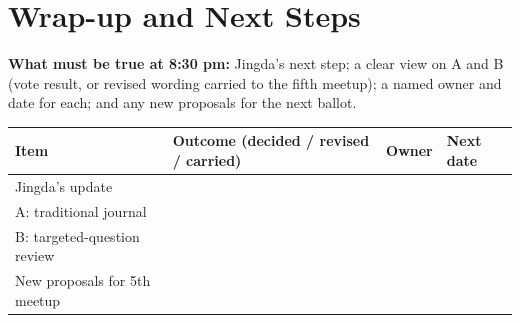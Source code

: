 \documentclass[11pt]{article}
\begin{document}
\section{Wrap-up and Next Steps}
{\small\textbf{What must be true at 8:30 pm:} Jingda's next step; a clear view on A and B (vote result, or revised wording carried to the fifth meetup); a named owner and date for each; and any new proposals for the next ballot.}

{\footnotesize\renewcommand{\arraystretch}{1.2}
\begin{longtable}{@{}p{4.2cm}p{4.3cm}p{2.4cm}p{3cm}@{}}
\toprule
\textbf{Item} & \textbf{Outcome (decided / revised / carried)} & \textbf{Owner} & \textbf{Next date} \\
\midrule
\endhead
\bottomrule
\endlastfoot
Jingda's update & & & \\[9pt]
A: traditional journal & & & \\[9pt]
B: targeted-question review & & & \\[9pt]
New proposals for 5th meetup & & & \\[9pt]
\end{longtable}}
\end{document}
